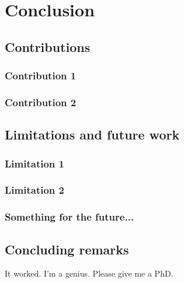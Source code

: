
\chapter{Conclusion}


\section{Contributions}
	
\subsection{Contribution 1}


\subsection{Contribution 2}


\section{Limitations and future work}

\subsection{Limitation 1}

\subsection{Limitation 2}

\subsection{Something for the future...}

\section{Concluding remarks}

It worked. I'm a genius. Please give me a PhD.	
